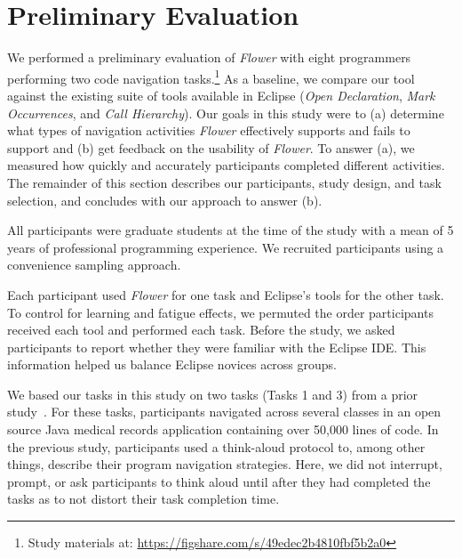 \documentclass[conference]{IEEEtran}
\begin{document}


\section{Preliminary Evaluation}
We performed a preliminary evaluation of \textit{Flower} with eight programmers performing two code navigation tasks.\footnote{Study materials at: 
	\url{https://figshare.com/s/49edec2b4810fbf5b2a0}}
As a baseline, we compare our tool against the existing suite of tools available in Eclipse (\emph{Open Declaration}, \emph{Mark Occurrences}, and \emph{Call Hierarchy}).
Our goals in this study were to (a) determine what types of navigation activities \textit{Flower} effectively supports and fails to support and (b) get feedback on the usability of \textit{Flower}.
To answer (a), we measured how quickly and accurately participants completed different activities.
The remainder of this section describes our participants, study design, and task selection, and concludes with our approach to answer (b).

All participants were graduate students at the time of the study with a mean of 5 years of professional programming experience. 
We recruited participants using a convenience sampling approach. 

Each participant used \textit{Flower} for one task and Eclipse's tools for the other task.
To control for learning and fatigue effects, we permuted the order participants received each tool and performed each task. 
Before the study, we asked participants to report whether they were familiar with the Eclipse IDE. This information helped us balance Eclipse novices across groups.

We based our tasks in this study on two tasks (Tasks 1 and 3) from a prior study~\cite{Smith2015}.
For these tasks, participants navigated across several classes in an open source Java medical records application containing over 50,000 lines of code.
In the previous study, participants used a think-aloud protocol to, among other things, describe their program navigation strategies.
Here, we did not interrupt, prompt, or ask participants to think aloud until after they had completed the tasks as to not distort their task completion time.
\end{document}
